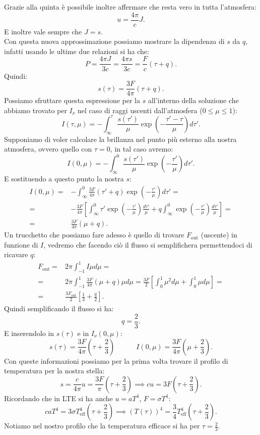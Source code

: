 Grazie alla quinta è possibile inoltre affermare che resta vero in tutta l'atmosfera:
\[
	u = \frac{4\pi}{c}J
.\] 
E inoltre vale sempre che $J = s$.\\
Con questa nuova approssimazione possiamo mostrare la dipendenza di $s$ da $q$, infatti usando le ultime due relazioni si ha che:
\[
	P = \frac{4\pi J}{3c} = \frac{4\pi s}{3c} = \frac{F}{c}\left( \tau + q \right) 
.\] 
Quindi:
\[
	s( \tau )  = \frac{3F}{4\pi}\left( \tau + q \right) 
.\] 
Possiamo sfruttare questa espressione per la $s$ all'interno della soluzione che abbiamo trovato per $I_{\nu} $ nel caso di raggi uscenti dall'atmosfera ($0 \le \mu  \le 1$):
\[
	I( \tau , \mu )  = - \int_{\infty}^{\tau } \frac{s( \tau ') }{\mu } \exp\left(- \frac{\tau ' - \tau }{\mu } \right) d\tau ' 
.\]
Supponiamo di voler calcolare la brillanza nel punto più esterno alla nostra atmosfera, ovvero quello con $\tau = 0$, in tal caso avremo:
\[
	I( 0 , \mu )  = -  \int_{\infty}^{0 } \frac{s( \tau ') }{\mu } \exp\left(- \frac{\tau ' }{\mu } \right) d\tau ' 
.\] 
E sostituendo a questo punto la nostra $s$: 
\begin{align}
	I( 0, \mu ) =& - \int_{\infty}^{0} \frac{3F}{4\pi}\left( \tau ' + q \right) \exp\left( - \frac{\tau '}{\mu } \right)  d\tau '=\\
	=& - \frac{3F}{4\pi}
	\left[ \int_{\infty}^{0} \tau ' \exp\left( - \frac{\tau '}{\mu } \right) \frac{d\tau '}{\mu } + 
	q \int_{\infty}^{0} \exp\left( -\frac{\tau '}{\mu } \right) \frac{d\tau '}{\mu }  \right] =\\
	= &  \frac{3F}{4\pi}\left( \mu + q \right) 
.\end{align}
Un trucchetto che possiamo fare adesso è quello di trovare $F_{\text{out}}$ (uscente) in funzione di $I$, vedremo che facendo ciò il flusso si semplifichera permettendoci di ricavare $q$:
\begin{align}
	F_{\text{out}} =& 2\pi \int_{-1}^{1} I \mu d\mu = \\
	= & 2\pi \int_{-1}^{1} \frac{3F}{4\pi}\left( \mu + q \right) \mu d\mu = \frac{3F}{2}\left[ \int_{0}^{1} \mu ^2d\mu + \int_{0}^{1} \mu d\mu    \right] =\\
	= &\frac{3F_{\text{out}}}{2}\left[ \frac{1}{3} + \frac{q}{2} \right] 
.\end{align}
Quindi semplificando il flusso si ha:
\[
	q = \frac{2}{3}
.\] 
E inserendolo in $s( \tau ) $ e in $I_{\nu} ( 0, \mu ) $:
\[
	s( \tau ) = \frac{3F}{4\pi}\left( \tau + \frac{2}{3} \right) \quad \quad \quad I( 0, \mu ) = \frac{3F}{4\pi}\left( \mu + \frac{2}{3} \right) 
.\] 
Con queste informazioni possiamo per la prima volta trovare il profilo di temperatura per la nostra stella:
\[
	s = \frac{c}{4\pi} u = \frac{3F}{\pi}\left( \tau  + \frac{2}{3}\right) \implies cu = 3F\left( \tau + \frac{2}{3} \right) 
.\]
Ricordando che in LTE si ha anche $u = aT^{4}$, $F = \sigma  T^{4}$:
\[
	caT^{4}=3\sigma T_{\text{eff}}^{4}\left( \tau +\frac{2}{3} \right) \implies \left( T( \tau ) \right) ^{4}= \frac{3}{4}T^{4}_{\text{eff}}\left( \tau +\frac{2}{3} \right)  
.\] 
Notiamo nel nostro profilo che la temperatura efficace si ha per $\tau  = \frac{2}{3}$.\\
